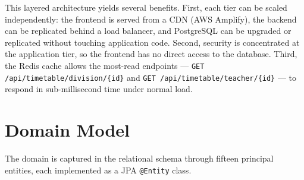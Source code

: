 This layered architecture yields several benefits. First, each tier can be scaled independently: the frontend is served from a CDN (AWS Amplify), the backend can be replicated behind a load balancer, and PostgreSQL can be upgraded or replicated without touching application code. Second, security is concentrated at the application tier, so the frontend has no direct access to the database. Third, the Redis cache allows the most-read endpoints --- \texttt{GET /api/timetable/division/\{id\}} and \texttt{GET /api/timetable/teacher/\{id\}} --- to respond in sub-millisecond time under normal load.

\section{Domain Model}

The domain is captured in the relational schema through fifteen principal entities, each implemented as a JPA \texttt{@Entity} class.

